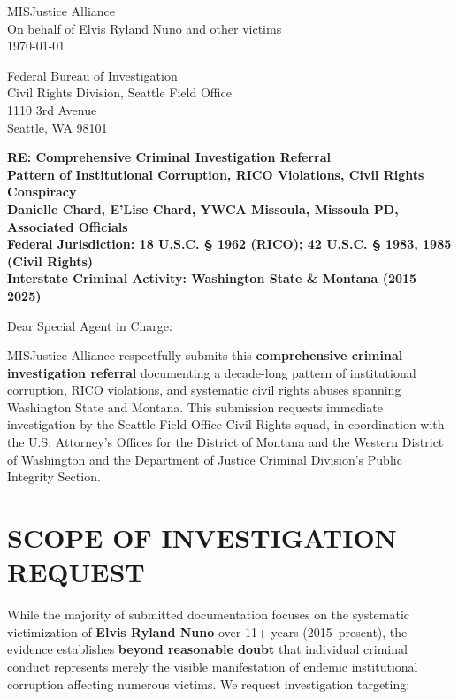 \documentclass[12pt,oneside]{article}
\begin{document}
\begin{flushleft}

MISJustice Alliance \\
On behalf of Elvis Ryland Nuno and other victims \\
\today

\vspace{0.3in}

Federal Bureau of Investigation \\
Civil Rights Division, Seattle Field Office \\
1110 3rd Avenue \\
Seattle, WA 98101

\vspace{0.3in}

\textbf{RE: Comprehensive Criminal Investigation Referral} \\
\textbf{Pattern of Institutional Corruption, RICO Violations, Civil Rights Conspiracy} \\
\textbf{Danielle Chard, E'Lise Chard, YWCA Missoula, Missoula PD, Associated Officials} \\
\textbf{Federal Jurisdiction: 18 U.S.C. § 1962 (RICO); 42 U.S.C. § 1983, 1985 (Civil Rights)} \\
\textbf{Interstate Criminal Activity: Washington State \& Montana (2015--2025)}

\vspace{0.3in}

Dear Special Agent in Charge:

\vspace{0.2in}

MISJustice Alliance respectfully submits this \textbf{comprehensive criminal investigation referral} documenting a decade-long pattern of institutional corruption, RICO violations, and systematic civil rights abuses spanning Washington State and Montana. This submission requests immediate investigation by the Seattle Field Office Civil Rights squad, in coordination with the U.S. Attorney's Offices for the District of Montana and the Western District of Washington and the Department of Justice Criminal Division's Public Integrity Section.

\section*{SCOPE OF INVESTIGATION REQUEST}

While the majority of submitted documentation focuses on the systematic victimization of \textbf{Elvis Ryland Nuno} over 11+ years (2015--present), the evidence establishes \textbf{beyond reasonable doubt} that individual criminal conduct represents merely the visible manifestation of endemic institutional corruption affecting numerous victims. We request investigation targeting:


\end{flushleft}
\end{document}
